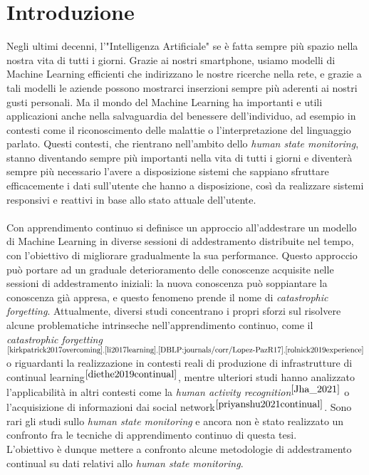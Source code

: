 \chapter*{Introduzione}

Negli ultimi decenni, l'"Intelligenza Artificiale" se è fatta sempre più spazio nella nostra vita di tutti i giorni. Grazie ai nostri smartphone, usiamo modelli di Machine Learning efficienti che indirizzano le nostre ricerche nella rete, e grazie a tali modelli le aziende possono mostrarci inserzioni sempre più aderenti ai nostri gusti personali. Ma il mondo del Machine Learning ha importanti e utili applicazioni anche nella salvaguardia del benessere dell'individuo, ad esempio in contesti come il riconoscimento delle malattie o l'interpretazione del linguaggio parlato. Questi contesti, che rientrano nell'ambito dello \textit{human state monitoring}, stanno diventando sempre più importanti nella vita di tutti i giorni e diventerà sempre più necessario l'avere a disposizione sistemi che sappiano sfruttare efficacemente i dati sull'utente che hanno a disposizione, così da realizzare sistemi responsivi e reattivi in base allo stato attuale dell'utente.\\\\
Con apprendimento continuo si definisce un approccio all'addestrare un modello di Machine Learning in diverse sessioni di addestramento distribuite nel tempo, con l'obiettivo di migliorare gradualmente la sua performance. Questo approccio può portare ad un graduale deterioramento delle conoscenze acquisite nelle sessioni di addestramento iniziali: la nuova conoscenza può soppiantare la conoscenza già appresa, e questo fenomeno prende il nome di \textit{catastrophic forgetting}. Attualmente, diversi studi concentrano i propri sforzi sul risolvere alcune problematiche intrinseche nell'apprendimento continuo, come il \textit{catastrophic forgetting}$^{\cite{kirkpatrick2017overcoming},\cite{li2017learning},\cite{DBLP:journals/corr/Lopez-PazR17},\cite{rolnick2019experience}}$ o riguardanti la realizzazione in contesti reali di produzione di infrastrutture di continual learning$^{\cite{diethe2019continual}}$, mentre ulteriori studi hanno analizzato l'applicabilità in altri contesti come la \textit{human activity recognition}$^{\cite{Jha_2021}}$ o l'acquisizione di informazioni dai social network$^{\cite{priyanshu2021continual}}$. Sono rari gli studi sullo \textit{human state monitoring} e ancora non è stato realizzato un confronto fra le tecniche di apprendimento continuo di questa tesi.\\
L'obiettivo è dunque mettere a confronto alcune metodologie di addestramento continual su dati relativi allo \textit{human state monitoring}.
